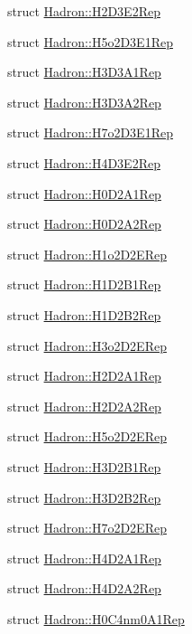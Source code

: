 \begin{DoxyCompactItemize}
struct \mbox{\hyperlink{structHadron_1_1H2D3E2Rep}{Hadron\+::\+H2\+D3\+E2\+Rep}}
\item 
struct \mbox{\hyperlink{structHadron_1_1H5o2D3E1Rep}{Hadron\+::\+H5o2\+D3\+E1\+Rep}}
\item 
struct \mbox{\hyperlink{structHadron_1_1H3D3A1Rep}{Hadron\+::\+H3\+D3\+A1\+Rep}}
\item 
struct \mbox{\hyperlink{structHadron_1_1H3D3A2Rep}{Hadron\+::\+H3\+D3\+A2\+Rep}}
\item 
struct \mbox{\hyperlink{structHadron_1_1H7o2D3E1Rep}{Hadron\+::\+H7o2\+D3\+E1\+Rep}}
\item 
struct \mbox{\hyperlink{structHadron_1_1H4D3E2Rep}{Hadron\+::\+H4\+D3\+E2\+Rep}}
\item 
struct \mbox{\hyperlink{structHadron_1_1H0D2A1Rep}{Hadron\+::\+H0\+D2\+A1\+Rep}}
\item 
struct \mbox{\hyperlink{structHadron_1_1H0D2A2Rep}{Hadron\+::\+H0\+D2\+A2\+Rep}}
\item 
struct \mbox{\hyperlink{structHadron_1_1H1o2D2ERep}{Hadron\+::\+H1o2\+D2\+E\+Rep}}
\item 
struct \mbox{\hyperlink{structHadron_1_1H1D2B1Rep}{Hadron\+::\+H1\+D2\+B1\+Rep}}
\item 
struct \mbox{\hyperlink{structHadron_1_1H1D2B2Rep}{Hadron\+::\+H1\+D2\+B2\+Rep}}
\item 
struct \mbox{\hyperlink{structHadron_1_1H3o2D2ERep}{Hadron\+::\+H3o2\+D2\+E\+Rep}}
\item 
struct \mbox{\hyperlink{structHadron_1_1H2D2A1Rep}{Hadron\+::\+H2\+D2\+A1\+Rep}}
\item 
struct \mbox{\hyperlink{structHadron_1_1H2D2A2Rep}{Hadron\+::\+H2\+D2\+A2\+Rep}}
\item 
struct \mbox{\hyperlink{structHadron_1_1H5o2D2ERep}{Hadron\+::\+H5o2\+D2\+E\+Rep}}
\item 
struct \mbox{\hyperlink{structHadron_1_1H3D2B1Rep}{Hadron\+::\+H3\+D2\+B1\+Rep}}
\item 
struct \mbox{\hyperlink{structHadron_1_1H3D2B2Rep}{Hadron\+::\+H3\+D2\+B2\+Rep}}
\item 
struct \mbox{\hyperlink{structHadron_1_1H7o2D2ERep}{Hadron\+::\+H7o2\+D2\+E\+Rep}}
\item 
struct \mbox{\hyperlink{structHadron_1_1H4D2A1Rep}{Hadron\+::\+H4\+D2\+A1\+Rep}}
\item 
struct \mbox{\hyperlink{structHadron_1_1H4D2A2Rep}{Hadron\+::\+H4\+D2\+A2\+Rep}}
\item 
struct \mbox{\hyperlink{structHadron_1_1H0C4nm0A1Rep}{Hadron\+::\+H0\+C4nm0\+A1\+Rep}}

\end{DoxyCompactItemize}
